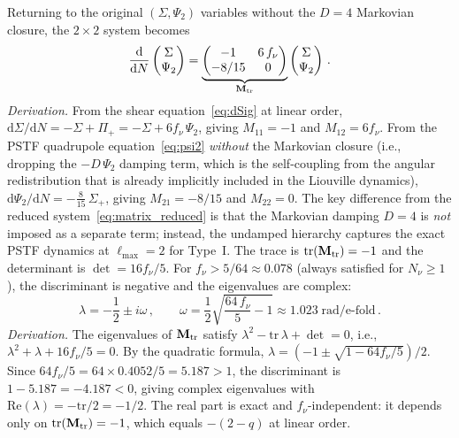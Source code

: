 \documentclass[a4paper,11pt]{article}
\newcommand{\Sig}{\Sigma}
\newcommand{\dd}{\mathrm{d}}
\begin{document}
Returning to the original $(\Sig, \Psi_2)$ variables without the $D = 4$ Markovian closure, the $2\times 2$ system becomes
\begin{equation}
\frac{\dd}{\dd N}\begin{pmatrix} \Sig \\ \Psi_2 \end{pmatrix}
= \underbrace{\begin{pmatrix} -1 & 6\,f_\nu \\ -8/15 & 0 \end{pmatrix}}_{\mathbf{M}_{\rm tr}}
\begin{pmatrix} \Sig \\ \Psi_2 \end{pmatrix}\,.\label{eq:matrix_transport}
\end{equation}
\textit{Derivation.}  From the shear equation~\eqref{eq:dSig} at linear order, $\dd\Sig/\dd N = -\Sig + \Pi_+ = -\Sig + 6f_\nu\,\Psi_2$, giving $M_{11} = -1$ and $M_{12} = 6f_\nu$.  From the PSTF quadrupole equation~\eqref{eq:psi2} \emph{without} the Markovian closure (i.e., dropping the $-D\,\Psi_2$ damping term, which is the self-coupling from the angular redistribution that is already implicitly included in the Liouville dynamics), $\dd\Psi_2/\dd N = -\frac{8}{15}\,\Sig_+$, giving $M_{21} = -8/15$ and $M_{22} = 0$.  The key difference from the reduced system~\eqref{eq:matrix_reduced} is that the Markovian damping $D = 4$ is \emph{not} imposed as a separate term; instead, the undamped hierarchy captures the exact PSTF dynamics at $\ell_{\max} = 2$ for Type~I.
The trace is $\mathrm{tr}(\mathbf{M}_{\rm tr}) = -1$ and the determinant is $\det = 16f_\nu/5$.  For $f_\nu > 5/64 \approx 0.078$ (always satisfied for $N_\nu \geq 1$), the discriminant is negative and the eigenvalues are complex:
\begin{equation}
\lambda = -\frac{1}{2} \pm i\omega\,,\qquad \omega = \frac{1}{2}\sqrt{\frac{64\,f_\nu}{5} - 1} \approx 1.023\;\text{rad/e-fold}\,.\label{eq:complex_lambda}
\end{equation}
\textit{Derivation.}  The eigenvalues of $\mathbf{M}_{\rm tr}$ satisfy $\lambda^2 - \mathrm{tr}\,\lambda + \det = 0$, i.e., $\lambda^2 + \lambda + 16f_\nu/5 = 0$.  By the quadratic formula, $\lambda = (-1 \pm \sqrt{1 - 64f_\nu/5})/2$.  Since $64f_\nu/5 = 64\times 0.4052/5 = 5.187 > 1$, the discriminant is $1 - 5.187 = -4.187 < 0$, giving complex eigenvalues with $\mathrm{Re}(\lambda) = -\mathrm{tr}/2 = -1/2$.  The real part is exact and $f_\nu$-independent: it depends only on $\mathrm{tr}(\mathbf{M}_{\rm tr}) = -1$, which equals $-(2-q)$ at linear order.
\end{document}
